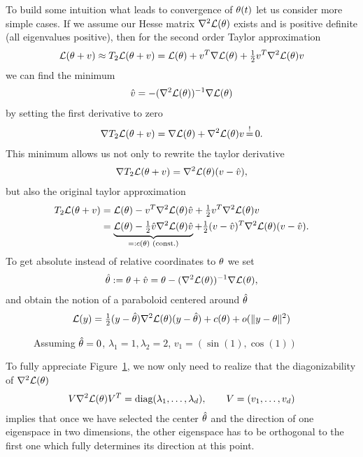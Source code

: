 To build some intuition what leads to convergence of \(\theta(t)\) let us
consider more simple cases. If we assume our Hesse matrix \(\nabla^2
\mathcal{L}(\theta)\) exists and is positive definite (all eigenvalues positive), then for
the second order Taylor approximation
%
\begin{align*}
	\mathcal{L}(\theta+v) \approx T_2\mathcal{L}(\theta+v)
	= \mathcal{L}(\theta) + v^T \nabla \mathcal{L}(\theta) + \tfrac12 v^T \nabla^2 \mathcal{L}(\theta) v
\end{align*}
%
we can find the minimum 
\begin{align*}
	\hat{v} = -(\nabla^2 \mathcal{L}(\theta))^{-1}\nabla \mathcal{L}(\theta)
\end{align*}
by setting the first derivative to zero
%
\begin{align*}
	\nabla T_2\loss(\weights+v) = \nabla \loss(\weights) + \nabla^2\loss(\weights) v \xeq{!} 0.
\end{align*}
%
This minimum allows us not only to rewrite the taylor derivative
%
\begin{align*}
	\nabla T_2\mathcal{L}(\theta+v) = \nabla^2 \mathcal{L}(\theta)(v-\hat{v}),
\end{align*}
%
but also the original taylor approximation
%
\begin{align*}
	T_2\mathcal{L}(\theta+v)
	&= \mathcal{L}(\theta) - v^T \nabla^2 \mathcal{L}(\theta) \hat{v} + \tfrac12 v^T \nabla^2 \mathcal{L}(\theta) v \\
	&= \underbrace{
		\mathcal{L}(\theta) - \tfrac12 \hat{v} \nabla^2 \mathcal{L}(\theta) \hat{v}
	}_{
		=: c(\theta) \text{ (const.)}
	} + \tfrac12 (v-\hat{v})^T \nabla^2 \mathcal{L}(\theta)(v-\hat{v}).
\end{align*}
%
To get absolute instead of relative coordinates to \(\theta\) we set
%
\begin{align*}
	\hat{\theta} := \theta + \hat{v} = \theta -(\nabla^2 \mathcal{L}(\theta))^{-1}\nabla \mathcal{L}(\theta),
\end{align*}
%
and obtain the notion of a paraboloid centered around \(\hat{\theta}\)
%
\begin{align}\label{paraboloid approximation of L}
	\mathcal{L}(y)
	= \tfrac12 (y- \hat{\theta}) \nabla^2 \mathcal{L}(\theta) (y-\hat{\theta})
	+ c(\theta) + o(\|y-\theta\|^2)
\end{align}
%
\begin{wrapfigure}{O}{0.65\textwidth}
	\centering
	\def\svgwidth{0.65\textwidth}
	
	\caption{Assuming \(\hat{\theta}=0\), \(\lambda_1=1, \lambda_2=2\), \(v_1=(\sin(1), \cos(1))\)}
	\label{fig: 2d paraboloid}
\end{wrapfigure}
%
To fully appreciate Figure~\ref{fig: 2d paraboloid}, we now only need to realize
that the diagonizability of \(\nabla^2 \mathcal{L}(\theta)\)
%
\begin{align}\label{eq: diagnalization of the Hesse matrix}
	V \nabla^2 \mathcal{L}(\theta) V^T
	= \text{diag}(\lambda_1,\dots,\lambda_d), \qquad V=(v_1,\dots, v_d)
\end{align}
%
implies that once we have selected the center \(\hat{\theta}\) and the direction of
one eigenspace in two dimensions, the other eigenspace has to be
orthogonal to the first one which fully determines its direction at this point. 

